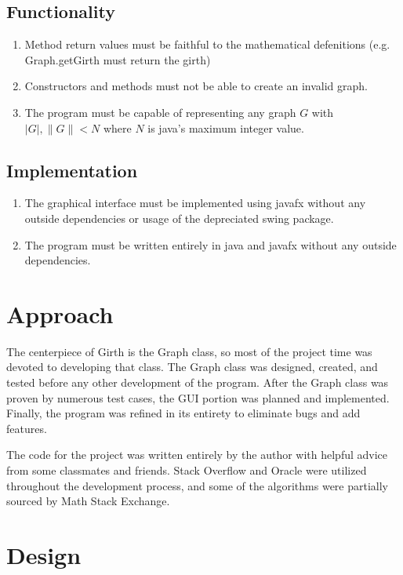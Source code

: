 \documentclass{article}
\begin{document}
\subsection{Functionality}
\begin{enumerate}
  \item Method return values must be faithful to the mathematical defenitions (e.g. Graph.getGirth must return the girth)
  \item Constructors and methods must not be able to create an invalid graph.
  \item The program must be capable of representing any graph $ G $ with $ | G |, \| G \| < N $ where $ N $ is java's
        maximum integer value.
\end{enumerate}

\subsection{Implementation}
\begin{enumerate}
  \item The graphical interface must be implemented using javafx without any outside dependencies or usage of the depreciated
        swing package.
  \item The program must be written entirely in java and javafx without any outside dependencies.
\end{enumerate}

\section{Approach}

The centerpiece of Girth is the Graph class, so most of the project time was devoted to developing that class.
The Graph class was designed, created, and tested before any other development of the program.
After the Graph class was proven by numerous test cases, the GUI portion was planned and implemented.
Finally, the program was refined in its entirety to eliminate bugs and add features.

The code for the project was written entirely by the author
with helpful advice from some classmates and friends.
Stack Overflow and Oracle were utilized throughout the development process,
and some of the algorithms were partially sourced by Math Stack Exchange.

\section{Design}
\end{document}

